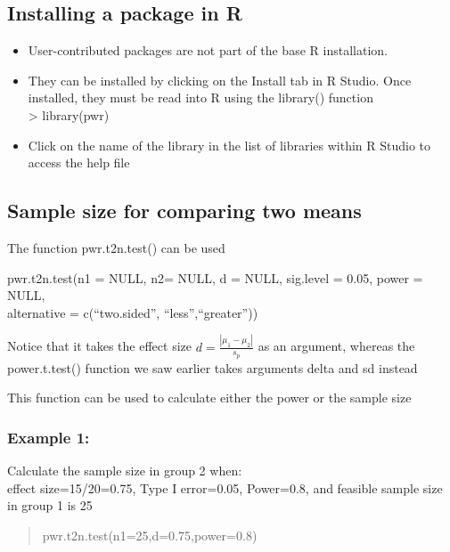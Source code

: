 \documentclass[
]{book}
\providecommand{\tightlist}{%
  \setlength{\itemsep}{0pt}\setlength{\parskip}{0pt}}
\begin{document}
\hypertarget{installing-a-package-in-r-1}{%
\subsection{Installing a package in R}\label{installing-a-package-in-r-1}}

\begin{itemize}
\tightlist
\item
  User-contributed packages are not part of the base R installation.
\item
  They can be installed by clicking on the Install tab in R Studio. Once installed, they must be read into R using the library() function\\
  \textgreater{} library(pwr)
\item
  Click on the name of the library in the list of libraries within R Studio to access the help file
\end{itemize}

\hypertarget{sample-size-for-comparing-two-means-1}{%
\subsection{Sample size for comparing two means}\label{sample-size-for-comparing-two-means-1}}

The function pwr.t2n.test() can be used

pwr.t2n.test(n1 = NULL, n2= NULL, d = NULL, sig.level = 0.05, power = NULL,\\
alternative = c(``two.sided'', ``less'',``greater''))

Notice that it takes the effect size \(d=\frac{|\mu_1-\mu_2|}{s_p}\) as an argument, whereas the power.t.test() function we saw earlier takes arguments delta and sd instead

This function can be used to calculate either the power or the sample size

\hypertarget{example-1-3}{%
\subsubsection{Example 1:}\label{example-1-3}}

Calculate the sample size in group 2 when:\\
effect size=15/20=0.75, Type I error=0.05, Power=0.8, and feasible sample size in group 1 is 25

\begin{quote}
pwr.t2n.test(n1=25,d=0.75,power=0.8)
\end{quote}
\end{document}
